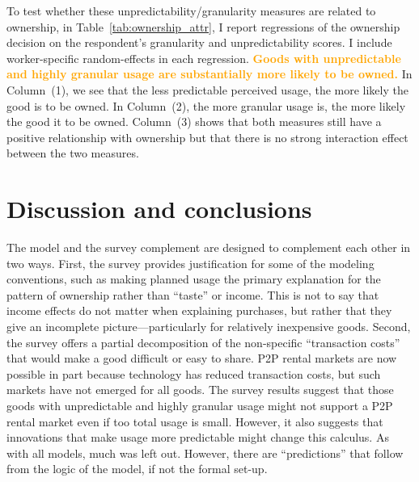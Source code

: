 \documentclass[11pt]{article}
\newcommand{\important}[1]{\textcolor{orange}{\textbf{#1}}}
\newcommand{\important}[1]{#1}
\begin{document}
To test whether these unpredictability/granularity measures are related to ownership, in Table~\ref{tab:ownership_attr}, I report regressions of the ownership decision on the respondent's granularity and unpredictability scores. 
I include worker-specific random-effects in each regression. 
\important{Goods with unpredictable and highly granular usage are substantially more likely to be owned.}
In Column~(1), we see that the less predictable perceived usage, the more likely the good is to be owned. 
In Column~(2), the more granular usage is, the more likely the good it to be owned. 
Column~(3) shows that both measures still have a positive relationship with ownership but that there is no strong interaction effect between the two measures. 

 

\section{Discussion and conclusions} 

The model and the survey complement are designed to complement each other in two ways. 
First, the survey provides justification for some of the modeling conventions, such as making planned usage the primary explanation for the pattern of ownership rather than ``taste'' or income. 
This is not to say that income effects do not matter when explaining purchases, but rather that they give an incomplete picture---particularly for relatively inexpensive goods.
Second, the survey offers a partial decomposition of the non-specific ``transaction costs'' that would make a good difficult or easy to share.  
P2P rental markets are now possible in part because technology has reduced transaction costs, but such markets have not emerged for all goods. 
The survey results suggest that those goods with unpredictable and highly granular usage might not support a P2P rental market even if too total usage is small. 
However, it also suggests that innovations that make usage more predictable might change this calculus. 
As with all models, much was left out. 
However, there are ``predictions'' that follow from the logic of the model, if not the formal set-up. 
\end{document}
